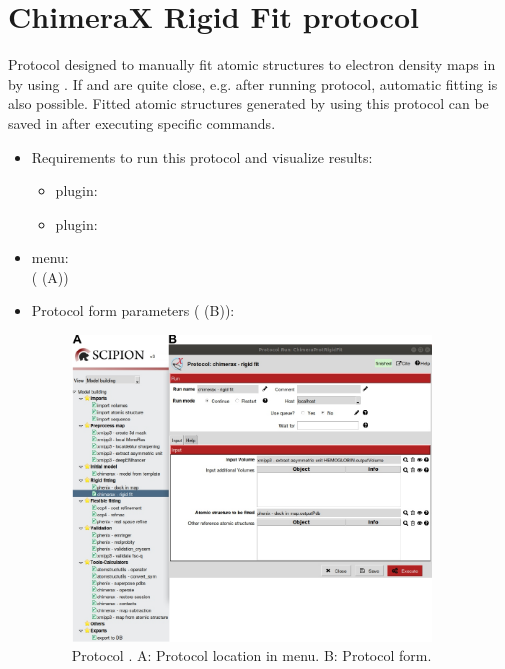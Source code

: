 \section{ChimeraX Rigid Fit protocol}
\label{app:chimeraRigidFit}%
Protocol designed to manually fit atomic structures to electron density maps in \scipion by using \chimera. If  and  are quite close, e.g. after running \phenix {} protocol, automatic fitting is also possible. Fitted atomic structures generated by using this protocol can be saved in \scipion after executing specific \chimera commands.
   
 \begin{itemize}
  \item Requirements to run this protocol and visualize results:
    \begin{itemize}
    \item \scipion plugin: 
        \item \scipion plugin: 
    \end{itemize}
  \item \scipion menu:\\
    ( (A))
  
  \item Protocol form parameters ( (B)):
  
    \begin{figure}[H]
     \centering 
     \captionsetup{width=.9\linewidth} 
     \includegraphics[width=0.90\textwidth]{Images_appendix/Fig116.pdf}
     \caption{Protocol . A: Protocol location in \scipion menu. B: Protocol form.}
     \label{fig:app_protocol_chimera_1}
    \end{figure}
    

\end{itemize}
